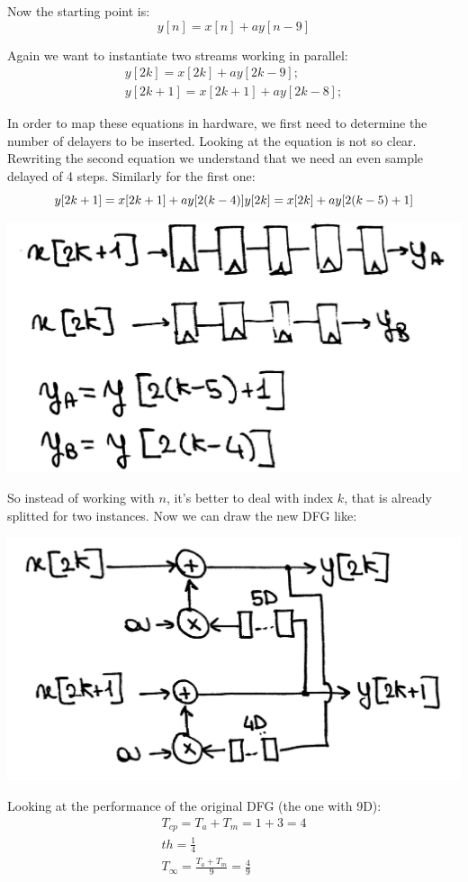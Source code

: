 Now the starting point is:
\begin{equation}
y[n]=x[n]+ay[n-9]
\end{equation}

Again we want to instantiate two streams working in parallel:
\begin{eqnarray}
y[2k]=x[2k]+ay[2k-9];     \\
y[2k+1]=x[2k+1]+ay[2k-8];
\end{eqnarray}

In order to map these equations in hardware, we first need to determine the number of delayers to be inserted. Looking at the equation is not so clear. Rewriting the second equation we understand that we need an even sample delayed of 4 steps. Similarly for the first one:
\begin{equation}
y[2k+1]=x[2k+1]+ay[2(k-4)] \\
y[2k]=x[2k]+ay[2(k-5)+1]
\end{equation}

\begin{center}
  \includegraphics[width=0.6\linewidth]{img/img1/23}
\end{center}

So instead of working with $n$, it's better to deal with index $k$, that is already splitted for two instances. Now we can draw the new DFG like:

\begin{center}
  \includegraphics[width=0.6\linewidth]{img/img1/24}
\end{center}

Looking at the performance of the original DFG (the one with 9D):
\begin{eqnarray}
T_{cp}=T_a+T_m=1+3=4\\
th=\frac{1}{4}\\
T_{\infty}=\frac{T_a+T_m}{9}=\frac{4}{9}
\end{eqnarray}

